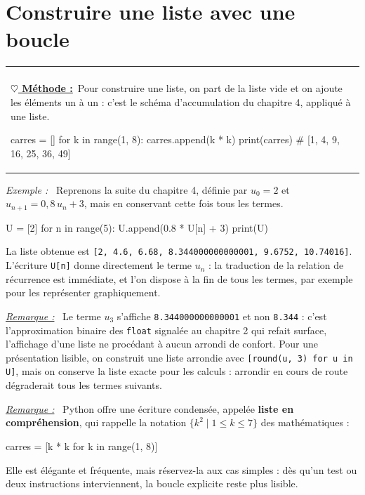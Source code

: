 \documentclass[a4paper,11pt,openany]{book}
\makeatletter
\newcommand{\mot}[1]{\textcolor{rougecours}{\textbf{#1}}}
\newcommand{\code}[1]{\texttt{\textcolor{codebleu}{#1}}}
\newenvironment{cadre}%
 {\par\vspace{2mm}\noindent\begin{tabular}{|@{\hspace{4mm}}p{0.93\textwidth}@{\hspace{4mm}}|}
  \hline \\[-2mm]}%
 {\\[2mm] \hline \end{tabular}\par\vspace{3mm}}
\newcommand{\methode}{\textbf{\underline{$\heartsuit$ Méthode :}}~}
\newenvironment{exemple}%
 {\par\vspace{1mm}\begin{list}{}{\leftmargin=1cm \rightmargin=0.5cm}\item[]%
  \textit{Exemple :}~}%
 {\end{list}\vspace{1mm}}
\newenvironment{remarque}%
 {\par\vspace{1mm}\begin{list}{}{\leftmargin=1cm \rightmargin=0.5cm}\item[]%
  \textit{\underline{Remarque :}}~}%
 {\end{list}\vspace{1mm}}
\makeatother
\begin{document}
\section{Construire une liste avec une boucle}

\begin{cadre}
\methode Pour construire une liste, on part de la liste vide et on ajoute les éléments un à un : c'est le schéma d'accumulation du chapitre 4, appliqué à une liste.
\begin{python}
carres = []
for k in range(1, 8):
    carres.append(k * k)
print(carres)          # [1, 4, 9, 16, 25, 36, 49]
\end{python}
\end{cadre}

\begin{exemple}
Reprenons la suite du chapitre 4, définie par $u_0 = 2$ et $u_{n+1} = 0{,}8\,u_n + 3$, mais en conservant cette fois tous les termes.
\begin{python}
U = [2]
for n in range(5):
    U.append(0.8 * U[n] + 3)
print(U)
\end{python}
La liste obtenue est \code{[2, 4.6, 6.68, 8.344000000000001, 9.6752, 10.74016]}. L'écriture \code{U[n]} donne directement le terme $u_n$ : la traduction de la relation de récurrence est immédiate, et l'on dispose à la fin de tous les termes, par exemple pour les représenter graphiquement.
\end{exemple}

\begin{remarque}
Le terme $u_3$ s'affiche \code{8.344000000000001} et non \code{8.344} : c'est l'approximation binaire des \code{float} signalée au chapitre 2 qui refait surface, l'affichage d'une liste ne procédant à aucun arrondi de confort. Pour une présentation lisible, on construit une liste arrondie avec \code{[round(u, 3) for u in U]}, mais on conserve la liste exacte pour les calculs : arrondir en cours de route dégraderait tous les termes suivants.
\end{remarque}

\begin{remarque}
Python offre une écriture condensée, appelée \mot{liste en compréhension}, qui rappelle la notation $\{k^2 \mid 1 \leqslant k \leqslant 7\}$ des mathématiques :
\begin{python}
carres = [k * k for k in range(1, 8)]
\end{python}
Elle est élégante et fréquente, mais réservez-la aux cas simples : dès qu'un test ou deux instructions interviennent, la boucle explicite reste plus lisible.
\end{remarque}
\end{document}
